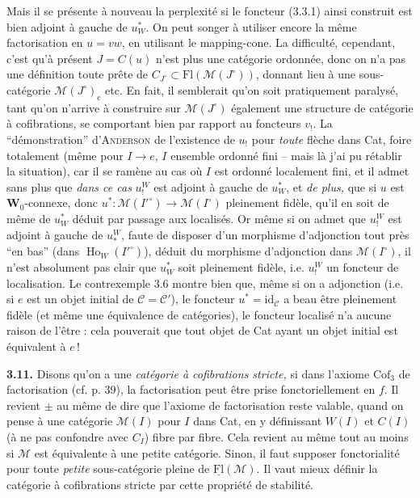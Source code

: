 \documentclass[11pt]{article}
\newcommand{\printedpage}[1]{\marginpar{\footnotesize p.~#1\ifstrequal{#1}{1}{\\[2pt]{[page 1]}}{}}}
\newcommand{\msp}[1]{\ifstrequal{#1}{page 1}{}{\marginpar{\footnotesize [#1]}}}
\newcommand{\Fl}{\mathrm{Fl}}
\newcommand{\M}{\mathcal{M}}
\newcommand{\Ho}{\operatorname{Ho}}
\newcommand{\id}{\mathrm{id}}
\begin{document}
\msp{page 67}
Mais il se présente à nouveau la perplexité si le foncteur (3.3.1) ainsi construit est bien adjoint à gauche de $u_W^*$. On peut songer à utiliser encore la même factorisation en $u = vw$, en
\printedpage{33}
utilisant le mapping-cone. La difficulté, cependant, c'est qu'à présent $J = C(u)$ n'est plus une catégorie ordonnée, donc on n'a pas une définition toute prête de $C_{J^\circ}\subset\Fl(\M(J^\circ))$, donnant lieu à une sous-catégorie $\M(J^\circ)_{\mathrm{c}}$ etc. En fait, il semblerait qu'on soit pratiquement paralysé, tant qu'on n'arrive à construire sur $\M(J^\circ)$ également une structure de catégorie à cofibrations, se comportant bien par rapport au foncteurs $v_!$. La %
“démonstration” d'\textsc{Anderson} de l'existence de $u_!$ pour \textit{toute} flèche dans Cat, foire totalement (même pour $I\longrightarrow e$, $I$ ensemble ordonné fini – mais là j'ai pu rétablir la situation), car il se ramène au cas où $I$ est ordonné localement fini, et il
\msp{page 68}
admet sans plus que \textit{dans ce cas} $u_!^W$ est adjoint à gauche de $u_W^*$, et \textit{de plus,} que si $u$ est $\mathbf{W}_0$-connexe, donc $u^* : \M(I'^\circ)\longrightarrow\M(I^\circ)$ pleinement fidèle, qu'il en soit de même de $u_W^*$ déduit par passage aux localisés. Or même si on admet que $u_!^W$ est adjoint à gauche de
$u_*^W$, faute de disposer d'un morphisme d'adjonction tout près “en bas” (dans $\Ho_W(I'^\circ)$), %
déduit du morphisme d'adjonction dans $\M(I^\circ)$, il n'est absolument pas clair que $u_W^*$ soit pleinement fidèle, i.e. $u_!^W$ un foncteur de localisation. Le contrexemple 3.6 montre bien que, même si on a adjonction (i.e. si $e$ est un objet initial de $\mathcal{C} = \mathcal{C}'$), le foncteur $u^* = \id_{\mathcal{C}}$ a beau être pleinement fidèle (et même une équivalence de catégories), le foncteur localisé n'a aucune raison de l'être : cela pouverait que tout objet de Cat ayant un objet initial %
est équivalent à $e$\,!

\msp{page 69}
\textbf{3.11.} Disons qu'on a une \textit{catégorie à cofibrations stricte,} si dans l'axiome $\mathrm{Cof}_3$ de factorisation (cf. p. 39), la factorisation peut être prise fonctoriellement en $f$. Il revient $\pm$ au même de dire que l'axiome de factorisation reste valable, quand on pense à une catégorie $\M(I)$ pour $I$ dans Cat, en y définissant $W(I)$ et $C(I)$ (à ne pas confondre avec $C_I$) fibre par fibre. Cela revient au même tout au moins si $\M$ est équivalente à une petite catégorie. Sinon, il faut supposer fonctorialité pour toute \textit{petite} sous-catégorie pleine de $\underline{\mathrm{Fl}}(\M)$. Il vaut mieux définir la catégorie à cofibrations stricte par cette propriété de stabilité.
\end{document}
